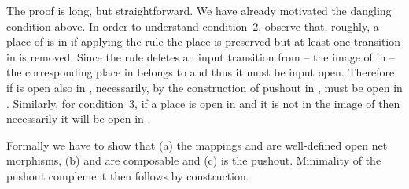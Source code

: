 \documentclass{LMCS}
\begin{document}
\proof
  The proof is long, but straightforward. We have already motivated the
  dangling condition above.
In order to understand condition~2, observe that, roughly,
  a place  of  is in    if   applying the 
  rule  the place is preserved but at least one
  transition in  is removed.
Since the rule deletes an input
  transition from  -- the image of  in  -- the
  corresponding place in  belongs to  and thus it must be
  input open.  Therefore if  is open also in , necessarily, by
  the construction of pushout in ,  must be open in .
Similarly, for condition~3, if a place is open in  and it is not in the
  image of  then necessarily it will be open in .
  
  Formally we have to show that (a) the mappings  and  are well-defined
  open net morphisms, (b)  and  are composable and (c)  is the
  pushout.
Minimality of the pushout complement then follows by construction.
\end{document}
